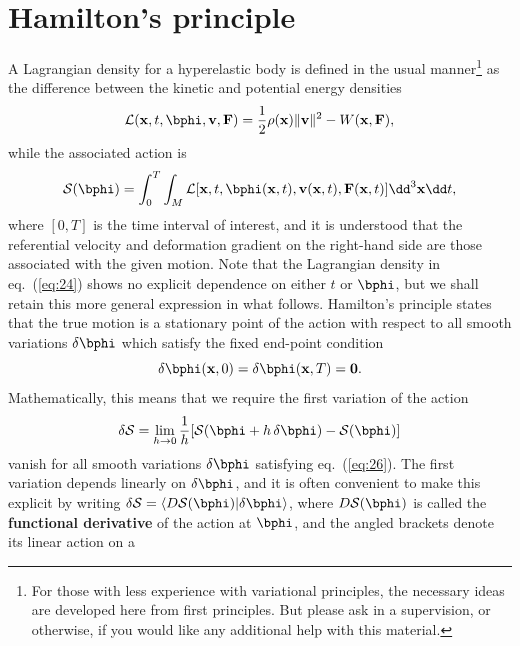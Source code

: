 \section*{Hamilton's principle}
A Lagrangian density for a hyperelastic body is defined in the usual manner\footnote{For those with less experience with variational principles, 
the necessary ideas are developed here from first principles. But please ask in a supervision, or otherwise, if you would 
like any additional help with this material.} as the difference between the kinetic and potential energy densities
\begin{equation}
\mathcal{L}(\mathbf{x},t,\bphi,\mathbf{v},\mathbf{F})=\frac{1}{2}\rho(\mathbf{x})\|\mathbf{v}\|^{2}-W(\mathbf{x},\mathbf{F}),
\label{eq:24}
\end{equation}
while the associated action is
\begin{equation}
\mathcal{S}(\bphi)=\int_{0}^{T}\int_{M}\mathcal{L}[\mathbf{x},t,\bphi(\mathbf{x},t),\mathbf{v}(\mathbf{x},t),\mathbf{F}(\mathbf{x},t)]\dd^{3}\mathbf{x}\dd t,
\label{eq:25}
\end{equation}
where $[0, T]$ is the time interval of interest, and it is understood that the referential velocity and deformation 
gradient on the right-hand side are those associated with the given motion. Note that the Lagrangian density in eq.~(\ref{eq:24}) 
shows no explicit dependence on either $t$ or $\bphi$, but we shall 
retain this more general expression in what follows. Hamilton's principle states that the true motion is a stationary point 
of the action with respect to all smooth variations $\delta\bphi$ which satisfy the fixed end-point condition
\begin{equation}
\delta\bphi(\mathbf{x},0)=\delta\bphi(\mathbf{x},T)=\mathbf{0}.
\label{eq:26}
\end{equation}
Mathematically, this means that we require the first variation of the action
\begin{equation}
\delta\mathcal{S}=\lim_{h\rightarrow0}\frac{1}{h}[\mathcal{S}(\bphi+h\,\delta\bphi)-\mathcal{S}(\bphi)]
\label{eq:27}
\end{equation}
vanish for all smooth variations $\delta\bphi$ satisfying eq.~(\ref{eq:26}). The first variation depends linearly on 
$\delta\bphi$, and it is often convenient to make this explicit by writing 
$\delta\mathcal{S}=\langle D\mathcal{S}(\bphi)|\delta\bphi\rangle$, where $D\mathcal{S}(\bphi)$ is called the 
\textbf{functional derivative} of the action at $\bphi$, and the angled brackets denote its linear action on a 
